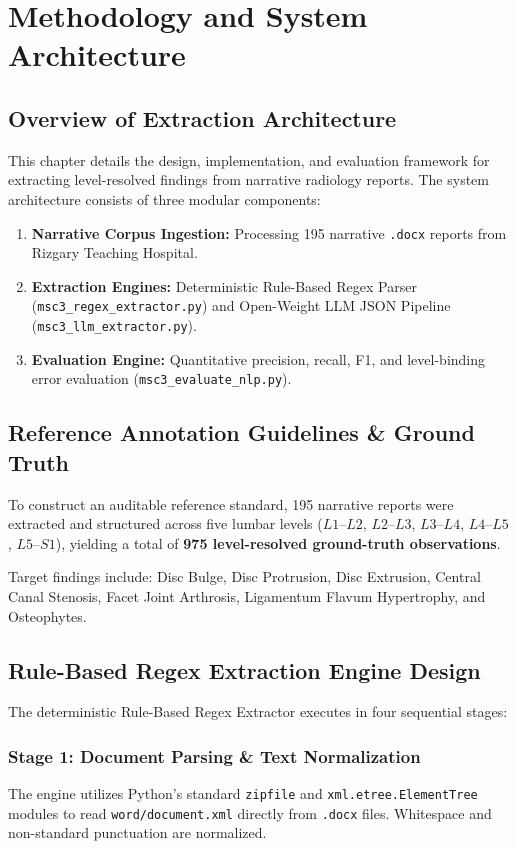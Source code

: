 \chapter{Methodology and System Architecture}
\label{ch:methodology}

\section{Overview of Extraction Architecture}
This chapter details the design, implementation, and evaluation framework for extracting level-resolved findings from narrative radiology reports. The system architecture consists of three modular components:
\begin{enumerate}
    \item \textbf{Narrative Corpus Ingestion:} Processing 195 narrative \texttt{.docx} reports from Rizgary Teaching Hospital.
    \item \textbf{Extraction Engines:} Deterministic Rule-Based Regex Parser (\texttt{msc3\_regex\_extractor.py}) and Open-Weight LLM JSON Pipeline (\texttt{msc3\_llm\_extractor.py}).
    \item \textbf{Evaluation Engine:} Quantitative precision, recall, F1, and level-binding error evaluation (\texttt{msc3\_evaluate\_nlp.py}).
\end{enumerate}

\section{Reference Annotation Guidelines \& Ground Truth}
To construct an auditable reference standard, 195 narrative reports were extracted and structured across five lumbar levels ($L1$--$L2$, $L2$--$L3$, $L3$--$L4$, $L4$--$L5$, $L5$--$S1$), yielding a total of \textbf{975 level-resolved ground-truth observations}.

Target findings include: Disc Bulge, Disc Protrusion, Disc Extrusion, Central Canal Stenosis, Facet Joint Arthrosis, Ligamentum Flavum Hypertrophy, and Osteophytes.

\section{Rule-Based Regex Extraction Engine Design}
The deterministic Rule-Based Regex Extractor executes in four sequential stages:

\subsection{Stage 1: Document Parsing \& Text Normalization}
The engine utilizes Python's standard \texttt{zipfile} and \texttt{xml.etree.ElementTree} modules to read \texttt{word/document.xml} directly from \texttt{.docx} files. Whitespace and non-standard punctuation are normalized.

